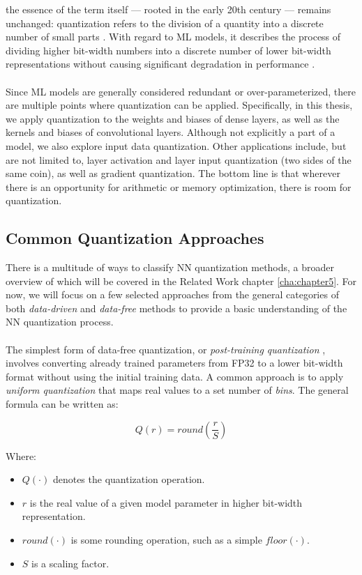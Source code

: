 the essence of the term itself — rooted in the early 20th century — remains unchanged:
quantization refers to the division of a quantity into a discrete number
of small parts \cite{gray1998quantization}. With regard to ML models, 
it describes the process of dividing higher bit-width numbers into a discrete number of lower bit-width representations
without causing significant degradation in performance \cite{gholami2021survey}.
\\
\\
Since ML models are generally considered redundant or over-parameterized,
there are multiple points where quantization can be applied.
Specifically, in this thesis, we apply quantization to the weights and biases of dense layers, 
as well as the kernels and biases of convolutional layers. 
Although not explicitly a part of a model, we also explore input data quantization. 
Other applications include, but are not limited to, layer activation and layer input quantization (two sides of the same coin),
as well as gradient quantization. The bottom line is that wherever there is an opportunity for arithmetic or memory optimization,
there is room for quantization.

\subsection{Common Quantization Approaches}
\label{subsec:subsection2}

There is a multitude of ways to classify NN quantization methods, a broader overview of which will be covered
in the Related Work chapter \ref{cha:chapter5}.
For now, we will focus on a few selected approaches from the general categories of both 
\textit{data-driven} and \textit{data-free} methods \cite{Edouard2022SPIQ} to provide a basic understanding of the NN quantization process.
\\
\\
The simplest form of data-free quantization, or \textit{post-training quantization} \cite{jiang2021efficient},
involves converting already trained parameters from FP32 to a lower bit-width format
without using the initial training data. 
A common approach is to apply \textit{uniform quantization} that maps real values to a set number
of \textit{bins}. The general formula can be written as:

\[
Q(r) = round(\frac{r}{S})
\]

\noindent Where:
\begin{itemize}
    \item $Q(\cdot)$ denotes the quantization operation.
    \item $r$ is the real value of a given model parameter in higher bit-width representation.
    \item $round(\cdot)$ is some rounding operation, such as a simple $floor(\cdot)$.
    \item $S$ is a scaling factor.
\end{itemize}

